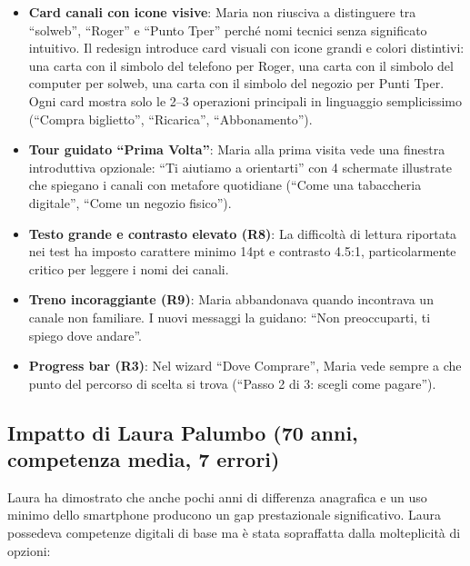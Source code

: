 \begin{itemize}
    \item \textbf{Card canali con icone visive}: Maria non riusciva a distinguere tra ``solweb'', ``Roger'' e ``Punto Tper'' perch\'e nomi tecnici senza significato intuitivo. Il redesign introduce card visuali con icone grandi e colori distintivi: una carta con il simbolo del telefono per Roger, una carta con il simbolo del computer per solweb, una carta con il simbolo del negozio per Punti Tper. Ogni card mostra solo le 2--3 operazioni principali in linguaggio semplicissimo (``Compra biglietto'', ``Ricarica'', ``Abbonamento'').
    \item \textbf{Tour guidato ``Prima Volta''}: Maria alla prima visita vede una finestra introduttiva opzionale: ``Ti aiutiamo a orientarti'' con 4 schermate illustrate che spiegano i canali con metafore quotidiane (``Come una tabaccheria digitale'', ``Come un negozio fisico'').
    \item \textbf{Testo grande e contrasto elevato (R8)}: La difficolt\`a di lettura riportata nei test ha imposto carattere minimo 14pt e contrasto 4.5:1, particolarmente critico per leggere i nomi dei canali.
    \item \textbf{Treno incoraggiante (R9)}: Maria abbandonava quando incontrava un canale non familiare. I nuovi messaggi la guidano: ``Non preoccuparti, ti spiego dove andare''.
    \item \textbf{Progress bar (R3)}: Nel wizard ``Dove Comprare'', Maria vede sempre a che punto del percorso di scelta si trova (``Passo 2 di 3: scegli come pagare'').
\end{itemize}

\subsection{Impatto di Laura Palumbo (70 anni, competenza media, 7 errori)}

Laura ha dimostrato che anche pochi anni di differenza anagrafica e un uso minimo dello smartphone producono un gap prestazionale significativo. Laura possedeva competenze digitali di base ma \`e stata sopraffatta dalla molteplicit\`a di opzioni:

